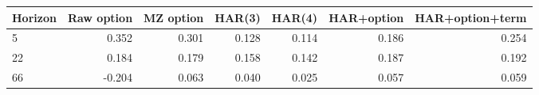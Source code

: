 \begin{tabular}{lrrrrrr}
\toprule
Horizon & Raw option & MZ option & HAR(3) & HAR(4) & HAR+option & HAR+option+term \\
\midrule
5 & 0.352 & 0.301 & 0.128 & 0.114 & 0.186 & 0.254 \\
22 & 0.184 & 0.179 & 0.158 & 0.142 & 0.187 & 0.192 \\
66 & -0.204 & 0.063 & 0.040 & 0.025 & 0.057 & 0.059 \\
\bottomrule
\end{tabular}
